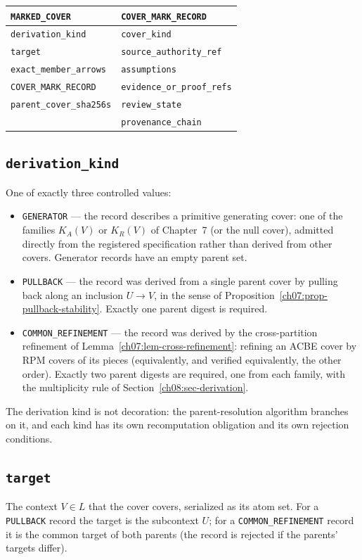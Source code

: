 \begin{center}
\begin{tabular}{@{}ll@{}}
\toprule
\texttt{MARKED\_COVER} & \texttt{COVER\_MARK\_RECORD} \\
\midrule
\texttt{derivation\_kind} & \texttt{cover\_kind} \\
\texttt{target} & \texttt{source\_authority\_ref} \\
\texttt{exact\_member\_arrows} & \texttt{assumptions} \\
\texttt{COVER\_MARK\_RECORD} & \texttt{evidence\_or\_proof\_refs} \\
\texttt{parent\_cover\_sha256s} & \texttt{review\_state} \\
 & \texttt{provenance\_chain} \\
\bottomrule
\end{tabular}
\end{center}

\subsection{\texttt{derivation\_kind}}
One of exactly three controlled values:
\begin{itemize}
\item \texttt{GENERATOR} --- the record describes a primitive generating cover: one of the families $K_{A}(V)$ or $K_{R}(V)$ of Chapter~7 (or the null cover), admitted directly from the registered specification rather than derived from other covers. Generator records have an empty parent set.
\item \texttt{PULLBACK} --- the record was derived from a single parent cover by pulling back along an inclusion $U\to V$, in the sense of Proposition~\ref{ch07:prop-pullback-stability}. Exactly one parent digest is required.
\item \texttt{COMMON\_REFINEMENT} --- the record was derived by the cross-partition refinement of Lemma~\ref{ch07:lem-cross-refinement}: refining an ACBE cover by RPM covers of its pieces (equivalently, and verified equivalently, the other order). Exactly two parent digests are required, one from each family, with the multiplicity rule of Section~\ref{ch08:sec-derivation}.
\end{itemize}
The derivation kind is not decoration: the parent-resolution algorithm branches on it, and each kind has its own recomputation obligation and its own rejection conditions.

\subsection{\texttt{target}}
The context $V\in L$ that the cover covers, serialized as its atom set. For a \texttt{PULLBACK} record the target is the subcontext $U$; for a \texttt{COMMON\_REFINEMENT} record it is the common target of both parents (the record is rejected if the parents' targets differ).

